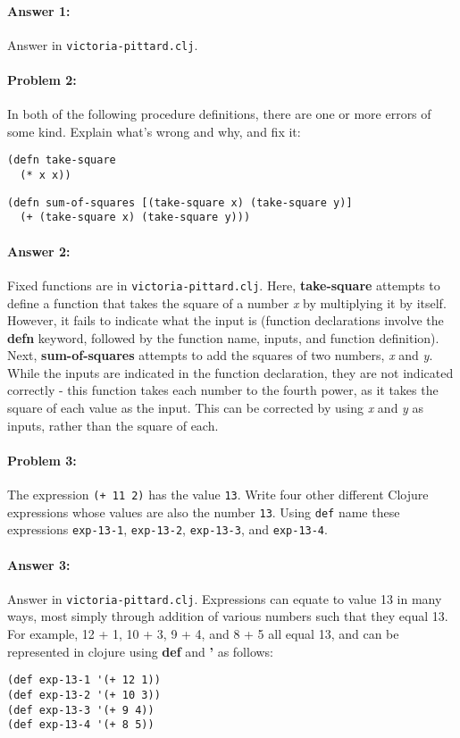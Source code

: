 \documentclass[10pt]{article}
\begin{document}
\paragraph{Answer 1:} Answer in \texttt{victoria-pittard.clj}.

\hrulefill
\paragraph{Problem 2:}
In both of the following procedure definitions, there are one or more errors of
some kind. Explain what's wrong and why, and fix it:

\begin{lstlisting}
(defn take-square
  (* x x))
\end{lstlisting}

\begin{lstlisting}
(defn sum-of-squares [(take-square x) (take-square y)]
  (+ (take-square x) (take-square y)))
\end{lstlisting}

\paragraph{Answer 2:} Fixed functions are in
\texttt{victoria-pittard.clj}. Here, \textbf{take-square} attempts to define a function that takes the square of a number \textit{x} by multiplying it by itself. However, it fails to indicate what the input is (function declarations involve the \textbf{defn} keyword, followed by the function name, inputs, and function definition). Next, \textbf{sum-of-squares} attempts to add the squares of two numbers, \textit{x} and \textit{y}. While the inputs are indicated in the function declaration, they are not indicated correctly - this function takes each number to the fourth power, as it takes the square of each value as the input. This can be corrected by using \textit{x} and \textit{y} as inputs, rather than the square of each.

\hrulefill
\paragraph{Problem 3:}
The expression \texttt{(+ 11 2)} has the value \texttt{13}. Write four
other different Clojure expressions whose values are also the number
\texttt{13}.  Using \texttt{def} name these expressions
\texttt{exp-13-1}, \texttt{exp-13-2}, \texttt{exp-13-3}, and
\texttt{exp-13-4}.

\paragraph{Answer 3:} Answer in \texttt{victoria-pittard.clj}. Expressions can equate to value 13 in many ways, most simply through addition of various numbers such that they equal 13. For example, 12 + 1, 10 + 3, 9 + 4, and 8 + 5 all equal 13, and can be represented in clojure using \textbf{def} and \textbf{'} as follows:
\begin{lstlisting}
(def exp-13-1 '(+ 12 1))
(def exp-13-2 '(+ 10 3))
(def exp-13-3 '(+ 9 4))
(def exp-13-4 '(+ 8 5))
\end{lstlisting}
\end{document}
